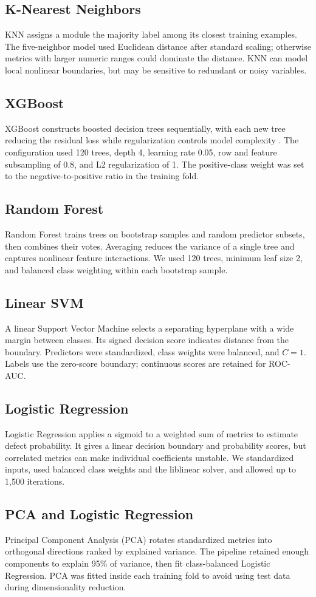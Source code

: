 \documentclass[conference]{IEEEtran}
\begin{document}
\subsection{K-Nearest Neighbors}
KNN assigns a module the majority label among its closest training examples. The five-neighbor model used Euclidean distance after standard scaling; otherwise metrics with larger numeric ranges could dominate the distance. KNN can model local nonlinear boundaries, but may be sensitive to redundant or noisy variables.
\subsection{XGBoost}
XGBoost constructs boosted decision trees sequentially, with each new tree reducing the residual loss while regularization controls model complexity \cite{chen2016}. The configuration used 120 trees, depth 4, learning rate 0.05, row and feature subsampling of 0.8, and L2 regularization of 1. The positive-class weight was set to the negative-to-positive ratio in the training fold.
\subsection{Random Forest}
Random Forest trains trees on bootstrap samples and random predictor subsets, then combines their votes. Averaging reduces the variance of a single tree and captures nonlinear feature interactions. We used 120 trees, minimum leaf size 2, and balanced class weighting within each bootstrap sample.
\subsection{Linear SVM}
A linear Support Vector Machine selects a separating hyperplane with a wide margin between classes. Its signed decision score indicates distance from the boundary. Predictors were standardized, class weights were balanced, and $C=1$. Labels use the zero-score boundary; continuous scores are retained for ROC-AUC.
\subsection{Logistic Regression}
Logistic Regression applies a sigmoid to a weighted sum of metrics to estimate defect probability. It gives a linear decision boundary and probability scores, but correlated metrics can make individual coefficients unstable. We standardized inputs, used balanced class weights and the liblinear solver, and allowed up to 1,500 iterations.
\subsection{PCA and Logistic Regression}
Principal Component Analysis (PCA) rotates standardized metrics into orthogonal directions ranked by explained variance. The pipeline retained enough components to explain 95\% of variance, then fit class-balanced Logistic Regression. PCA was fitted inside each training fold to avoid using test data during dimensionality reduction.
\end{document}
